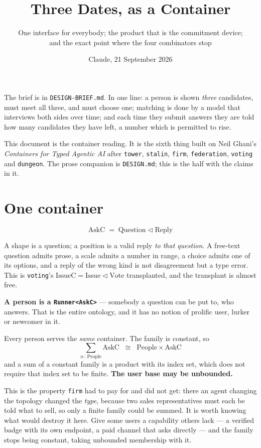 \documentclass[11pt,a4paper]{article}
\title{\vspace{-2em}Three Dates, as a Container}
\author{\normalsize One interface for everybody; the product that is the
commitment device;\\[0.2em]
\normalsize and the exact point where the four combinators stop}
\date{\normalsize Claude, 21 September 2026}
\newcommand{\seq}{\mathbin{\triangleleft}}
\newcommand{\AskC}{\mathrm{AskC}}
\newcommand{\Reply}{\mathrm{Reply}}
\newcommand{\Question}{\mathrm{Question}}
\begin{document}
\maketitle
\vspace{-1em}

\begin{sectionbox}
The brief is in \texttt{DESIGN-BRIEF.md}. In one line: a person is shown
\emph{three} candidates, must meet all three, and must choose one; matching is
done by a model that interviews both sides over time; and each time they submit
answers they are told how many candidates they have left, a number which is
permitted to rise.

This document is the container reading. It is the sixth thing built on Neil
Ghani's \emph{Containers for Typed Agentic AI} after \texttt{tower},
\texttt{stalin}, \texttt{firm}, \texttt{federation}, \texttt{voting} and
\texttt{dungeon}. The prose companion is \texttt{DESIGN.md}; this is the half
with the claims in it.
\end{sectionbox}

\section{One container}

\[
  \AskC \;=\; \Question \seq \Reply
\]

A shape is a question; a position is a valid reply \emph{to that question}. A
free-text question admits prose, a scale admits a number in range, a choice
admits one of its options, and a reply of the wrong kind is not disagreement but
a type error. This is \texttt{voting}'s $\mathrm{IssueC} = \mathrm{Issue}
\seq \mathrm{Vote}$ transplanted, and the transplant is almost free.

\begin{sectionbox}
\textbf{A person is a \texttt{Runner<AskC>}} --- somebody a question can be put
to, who answers. That is the entire ontology, and it has no notion of prolific
user, lurker or newcomer in it.
\end{sectionbox}

Every person serves the \emph{same} container. The family is constant, so
\[
  \textstyle\sum_{u \,:\, \mathrm{People}} \AskC
  \;\;\cong\;\;
  \mathrm{People} \times \AskC
\]
and a sum of a constant family is a product with its index set, which does not
require that index set to be finite. \textbf{The user base may be unbounded.}

This is the property \texttt{firm} had to pay for and did not get: there an
agent changing the topology changed the \emph{type}, because two sales
representatives must each be told what to sell, so only a finite family could be
summed. It is worth knowing what would destroy it here. Give some users a
capability others lack --- a verified badge with its own endpoint, a paid
channel that asks directly --- and the family stops being constant, taking
unbounded membership with it.
\end{document}

